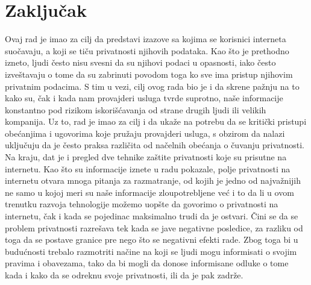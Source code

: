 \documentclass[a4paper]{article}
\begin{document}
\section{Zaključak}
\label{sec:zakljucak}
Ovaj rad je imao za cilj da predstavi izazove sa kojima se korisnici interneta suočavaju, a koji se tiču privatnosti njihovih podataka. Kao što je prethodno izneto, ljudi često nisu svesni da su njihovi podaci u opasnosti, iako često izveštavaju o tome da su zabrinuti povodom toga ko sve ima pristup njihovim privatnim podacima. S tim u vezi, cilj ovog rada bio je i da skrene pažnju na to kako su, čak i kada nam provajderi usluga tvrde suprotno, naše informacije konstantno pod rizikom iskorišćavanja od strane drugih ljudi ili velikih kompanija. Uz to, rad je imao za cilj i da ukaže na potrebu da se kritički pristupi obećanjima i ugovorima koje pružaju provajderi usluga, s obzirom da nalazi uključuju da je često praksa različita od načelnih obećanja o čuvanju privatnosti. Na kraju, dat je i pregled dve tehnike zaštite privatnosti koje su prisutne na internetu. Kao što su informacije iznete u radu pokazale, polje privatnosti na internetu otvara mnoga pitanja za razmatranje, od kojih je jedno od najvažnijih ne samo u kojoj meri su naše informacije zloupotrebljene već i to da li u ovom trenutku razvoja tehnologije možemo uopšte da govorimo o privatnosti na internetu, čak i kada se pojedinac maksimalno trudi da je ostvari. Čini se da se problem privatnosti razrešava tek kada se jave negativne posledice, za razliku od toga da se postave granice pre nego što se negativni efekti rade. Zbog toga bi u budućnosti trebalo razmotriti načine na koji se ljudi mogu informisati o svojim pravima i obavezama, tako da bi mogli da donose informisane odluke o tome kada i kako da se odreknu svoje privatnosti, ili da je pak zadrže.

 

\end{document}

